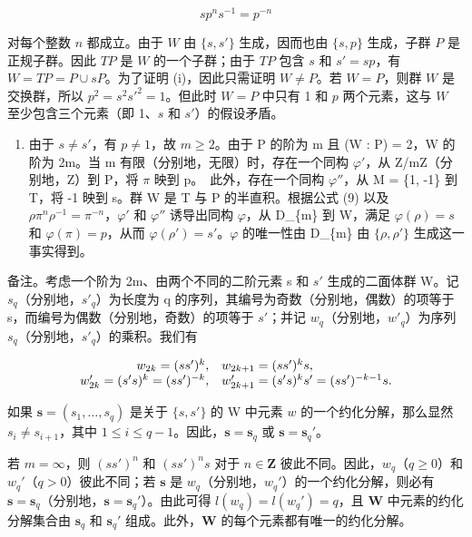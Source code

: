 \[
s p ^ {n} s ^ {- 1} = p ^ {- n}\tag{9}
\]

对每个整数 \(n\) 都成立。由于 \(W\) 由 \(\{s, s'\}\) 生成，因而也由 \(\{s, p\}\) 生成，子群 \(P\) 是正规子群。因此 \(TP\) 是 \(W\) 的一个子群；由于 \(TP\) 包含 \(s\) 和 \(s' = sp\)，有 \(W = TP = P \cup sP\)。为了证明 (i)，因此只需证明 \(W \neq P\)。若 \(W = P\)，则群 \(W\) 是交换群，所以 \(p^2 = s^2 s'^2 = 1\)。但此时 \(W = P\) 中只有 1 和 \(p\) 两个元素，这与 \(W\) 至少包含三个元素（即 1、\(s\) 和 \(s'\)）的假设矛盾。

\begin{enumerate}
\def\labelenumi{(\roman{enumi})}
\setcounter{enumi}{1}
\tightlist
\item
  由于 \(s \neq s'\)，有 \(p \neq 1\)，故 \(m \geqslant 2\)。由于 P 的阶为 m 且 (W : P) = 2，W 的阶为 2m。当 m 有限（分别地，无限）时，存在一个同构 \(\varphi'\)，从 Z/mZ（分别地，Z）到 P，将 \(\pi\) 映到 p。~此外，存在一个同构 \(\varphi''\)，从 M = \{1, -1\} 到 T，将 -1 映到 s。群 W 是 T 与 P 的半直积。根据公式 (9) 以及 \(\rho\pi^{n}\rho^{-1} = \pi^{-n}\)，\(\varphi'\) 和 \(\varphi''\) 诱导出同构 \(\varphi\)，从 D\_\{m\} 到 W，满足 \(\varphi(\rho) = s\) 和 \(\varphi(\pi) = p\)，从而 \(\varphi(\rho') = s'\)。\(\varphi\) 的唯一性由 D\_\{m\} 由 \(\{\rho, \rho'\}\) 生成这一事实得到。
\end{enumerate}

备注。考虑一个阶为 2m、由两个不同的二阶元素 s 和 \(s'\) 生成的二面体群 W。记 \(s_{q}\)（分别地，\(s'_{q}\)）为长度为 q 的序列，其编号为奇数（分别地，偶数）的项等于 s，而编号为偶数（分别地，奇数）的项等于 \(s'\)；并记 \(w_{q}\)（分别地，\(w'_{q}\)）为序列 \(s_{q}\)（分别地，\(s'_{q}\)）的乘积。我们有

\[
\begin{array}{r l} w _ {2 k} = (s s ^ {\prime}) ^ {k}, & w _ {2 k + 1} = (s s ^ {\prime}) ^ {k} s, \\ w _ {2 k} ^ {\prime} = (s ^ {\prime} s) ^ {k} = (s s ^ {\prime}) ^ {- k}, & w _ {2 k + 1} ^ {\prime} = (s ^ {\prime} s) ^ {k} s ^ {\prime} = (s s ^ {\prime}) ^ {- k - 1} s. \end{array}
\]

如果 \(\mathbf{s} = (s_1, \ldots, s_q)\) 是关于 \(\{s, s'\}\) 的 W 中元素 \(w\) 的一个约化分解，那么显然 \(s_i \neq s_{i+1}\)，其中 \(1 \leqslant i \leqslant q-1\)。因此，\(\mathbf{s} = \mathbf{s}_q\) 或 \(\mathbf{s} = \mathbf{s}_q'\)。

若 \(m = \infty\)，则 \((ss')^n\) 和 \((ss')^ns\) 对于 \(n \in \mathbf{Z}\) 彼此不同。因此，\(w_q\)（\(q \geqslant 0\)）和 \(w_q'\)（\(q > 0\)）彼此不同；若 \(\mathbf{s}\) 是 \(w_q\)（分别地，\(w_q'\)）的一个约化分解，则必有 \(\mathbf{s} = \mathbf{s}_q\)（分别地，\(\mathbf{s} = \mathbf{s}_q'\)）。由此可得 \(l(w_q) = l(w_q') = q\)，且 \(\mathbf{W}\) 中元素的约化分解集合由 \(\mathbf{s}_q\) 和 \(\mathbf{s}_q'\) 组成。此外，\(\mathbf{W}\) 的每个元素都有唯一的约化分解。

